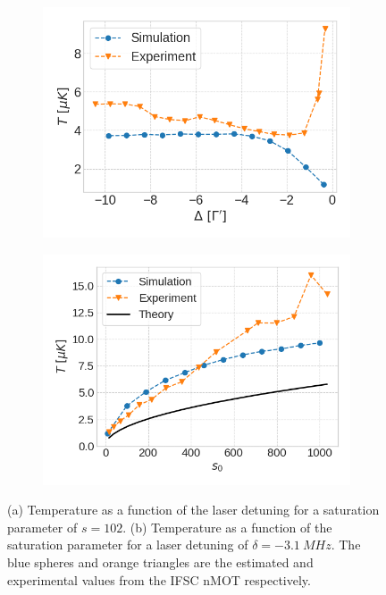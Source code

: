 \begin{figure}[!ht]
    \centering
    \begin{subfigure}[b]{0.48\linewidth}
        \centering
        \includegraphics[width=\textwidth]{USPSC-img/sr-ifsc-temperature_vs_detuning.png}
        \label{fig:IFSC-temperature-detuning}
    \end{subfigure}
    \hfill
    \begin{subfigure}[b]{0.48\linewidth}
        \centering
        \includegraphics[width=\textwidth]{USPSC-img/sr_ifsc_temperature_vs_saturation.png}
        \vspace{10px}
    \end{subfigure}
    \caption{(a) Temperature as a function of the laser detuning for a saturation parameter of $ s = 102 $. (b) Temperature as a function of the saturation parameter for a laser detuning of $ \delta = -3.1\ MHz $. The blue spheres and orange triangles are the estimated and experimental values from the IFSC nMOT respectively.}
\end{figure}
